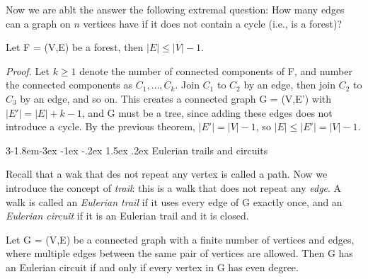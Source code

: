 \documentclass{tufte-handout}
\makeatletter
\renewcommand{\subsection}{\@startsection{subsection}%
    {3}{-1.8em}{-3ex \@plus -1ex \@minus -.2ex}%
    {1.5ex \@plus .2ex}
    {\hspace*{-5.5em}\fcolorbox{ltblue}{ltblue}{\parbox[c][1.0ex][b]{4em}{\phantom{space}}}
    \normalfont\large\itshape\color{ltblue}}}
\makeatother
\begin{document}
Now we are ablt the answer the following extremal question: How many edges
can a graph on \( n \) vertices have if it does not contain a cycle (i.e., is a forest)?

\begin{Corollary}
    Let F = (V,E) be a forest, then \(\left|E\right| \leq \left|V\right| - 1\).
\end{Corollary}
\textit{Proof.} Let \( k \geq 1\) denote the number of connected components of F, and
number the connected components as \( C_1, \ldots, C_k \). Join \( C_1 \) to \( C_2 \) by an edge,
then join \( C_2 \) to \( C_3 \) by an edge, and so on. This creates a connected graph G = (V,E')
with \( \left|E'\right| = \left|E\right| + k - 1 \), and G must be a tree, since adding
these edges does not introduce a cycle. By the previous theorem, 
\(\left|E'\right| = \left|V\right| - 1\), so \(\left|E\right| \leq \left|E'\right| = \left|V\right| - 1\). \qedsymbol

\subsection{Eulerian trails and circuits}

Recall that a wak that des not repeat any vertex is called a path. Now we introduce the concept of
\textit{trail}: this is a walk that does not repeat any \textit{edge}.
A walk is called an \textit{Eulerian trail} if it uses every edge of G exactly once, and an
\textit{Eulerian circuit} if it is an Eulerian trail and it is closed.



\begin{Theorem}
    Let G = (V,E) be a connected graph with a finite number of vertices and edges, where
    multiple edges between the same pair of vertices are allowed. Then G has an Eulerian circuit
    if and only if every vertex in G has even degree.
\end{Theorem}
\end{document}
